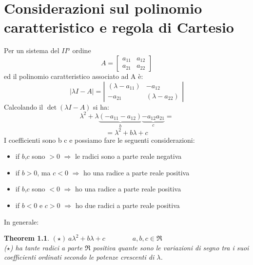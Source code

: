 \documentclass[a4paper]{report}
\begin{document}
\chapter{Considerazioni sul polinomio caratteristico e regola di
  Cartesio}\label{apx:stabil} 
Per un sistema del $II°$ ordine
\begin{displaymath}
  A=\left[
    \begin {array}	{ll} 
      a_{11} & a_{12}\\
      a_{21} & a_{22}
    \end{array}\right]
\end{displaymath}
ed il polinomio caratteristico associato ad A \`e:
\begin{displaymath}
  |\lambda I-A| = \left|
  \begin{array}{ll}(\lambda
    -a_{11})&-a_{12}\\-a_{21} & (\lambda -a_{22})
  \end{array}\right|
\end{displaymath}
Calcolando il $\det(\lambda I - A)$ si ha:
\begin{displaymath}
  \lambda^2 + \lambda\underbrace{(-a_{11}-a_{12})}_b\underbrace{-a_{12}a_{21}}_c =
\end{displaymath}
\begin{displaymath}
  =\lambda^2+b\lambda+c
\end{displaymath}
I coefficienti sono  \qquad b \qquad c \qquad e possiamo fare
le seguenti considerazioni: 
\begin {itemize}
\item if $b$,$c$ sono $>0$  $\Rightarrow$  le radici sono a parte reale negativa
\item if $b>0$, ma $c<0$   $\Rightarrow$  ho una radice a parte reale positiva
\item if $b$,$c$ sono $<0$  $\Rightarrow$  ho una radice a parte reale positiva
\item if $b<0$ e $c >0$  $\Rightarrow$  ho due radici a parte reale positiva
\end{itemize}
In generale: 
\newtheorem{cartesio}{Theorem}[chapter]
\begin{cartesio}
  $(\star) ~a\lambda^2+b\lambda+c \qquad \qquad a,b,c \in \Re$\\
  ($\star$) ha tante radici a parte $\Re$ positiva quante sono le
  variazioni di segno tra i suoi coefficienti ordinati secondo le
  potenze crescenti di $\lambda$.
\end{cartesio}
\end{document}
